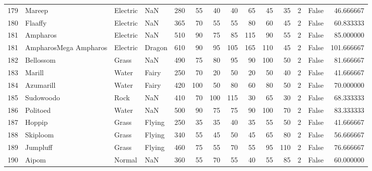 \begin{tabular}{rlllrrrrrrrrlr}
 179 &                     Mareep &  Electric &       NaN &    280 &   55 &      40 &       40 &       65 &       45 &     35 &           2 &      False &   46.666667 \\
 180 &                    Flaaffy &  Electric &       NaN &    365 &   70 &      55 &       55 &       80 &       60 &     45 &           2 &      False &   60.833333 \\
 181 &                   Ampharos &  Electric &       NaN &    510 &   90 &      75 &       85 &      115 &       90 &     55 &           2 &      False &   85.000000 \\
 181 &      AmpharosMega Ampharos &  Electric &    Dragon &    610 &   90 &      95 &      105 &      165 &      110 &     45 &           2 &      False &  101.666667 \\
 182 &                  Bellossom &     Grass &       NaN &    490 &   75 &      80 &       95 &       90 &      100 &     50 &           2 &      False &   81.666667 \\
 183 &                     Marill &     Water &     Fairy &    250 &   70 &      20 &       50 &       20 &       50 &     40 &           2 &      False &   41.666667 \\
 184 &                  Azumarill &     Water &     Fairy &    420 &  100 &      50 &       80 &       60 &       80 &     50 &           2 &      False &   70.000000 \\
 185 &                  Sudowoodo &      Rock &       NaN &    410 &   70 &     100 &      115 &       30 &       65 &     30 &           2 &      False &   68.333333 \\
 186 &                   Politoed &     Water &       NaN &    500 &   90 &      75 &       75 &       90 &      100 &     70 &           2 &      False &   83.333333 \\
 187 &                     Hoppip &     Grass &    Flying &    250 &   35 &      35 &       40 &       35 &       55 &     50 &           2 &      False &   41.666667 \\
 188 &                   Skiploom &     Grass &    Flying &    340 &   55 &      45 &       50 &       45 &       65 &     80 &           2 &      False &   56.666667 \\
 189 &                   Jumpluff &     Grass &    Flying &    460 &   75 &      55 &       70 &       55 &       95 &    110 &           2 &      False &   76.666667 \\
 190 &                      Aipom &    Normal &       NaN &    360 &   55 &      70 &       55 &       40 &       55 &     85 &           2 &      False &   60.000000 \\

\end{tabular}
